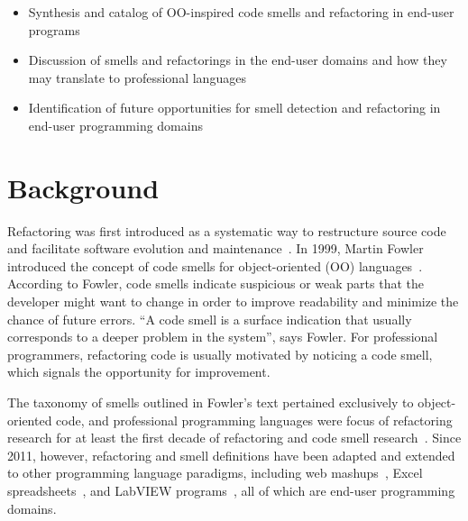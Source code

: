 \documentclass[10pt,conference,compsocconf]{IEEEtran}
\newcommand{\todo}[1]{\textbf{TODO: #1}}
\begin{document}
\begin{itemize}
	\item Synthesis and catalog of OO-inspired code smells  and refactoring in end-user programs
	\item Discussion of smells and refactorings in the end-user domains and how they may translate to professional languages
	\item Identification of future opportunities for smell detection and refactoring in end-user programming domains
\end{itemize}

\section{Background}
\label{sec:background}


Refactoring was first introduced as a systematic way to restructure source code and facilitate software evolution and maintenance~\cite{Opdyke:1992:ROF:169783, Griswold:1993:AAP:152388.152389}. In 1999, Martin Fowler introduced the concept of code smells for object-oriented (OO) languages~\cite{Fowl1999}. 
According to Fowler, code smells indicate suspicious or weak parts that the developer might want to change in order to improve readability and minimize the chance of future errors.
``A code smell is a surface indication that usually corresponds to a deeper problem in the system'', says Fowler. For professional programmers, refactoring code is usually motivated by noticing a code smell, which signals the opportunity for improvement.

The taxonomy of smells outlined in Fowler's text pertained exclusively to object-oriented code, and professional programming languages were focus of refactoring research for at least the first decade of refactoring and code smell research~\cite{Mens:2004:SSR:972215.972286}.
Since 2011, however, refactoring and smell definitions have been adapted and extended to other 
programming language paradigms, including web mashups~\cite{Stolee2011, StoleeTSE2013}, Excel spreadsheets~\cite{Hermans2011, Hermans2012inter, hermans2014bumblebee}, and LabVIEW programs~\cite{chambers2013smell}, all of which are end-user programming domains. 
\end{document}
